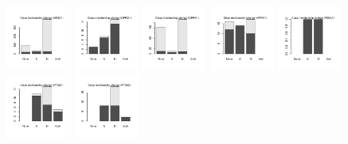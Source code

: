 \documentclass[utf8]{frontiersSCNS} %
\begin{document}
\begin{figure}[h!]
\includegraphics[width=0.19\textwidth]{figures/validation_plots/nr3c1_0p8_valplot.pdf}
\includegraphics[width=0.19\textwidth]{figures/validation_plots/oprd1_0p8_valplot.pdf}
\includegraphics[width=0.19\textwidth]{figures/validation_plots/oprk1_0p8_valplot.pdf}
\includegraphics[width=0.19\textwidth]{figures/validation_plots/oprm1_0p8_valplot.pdf}
\includegraphics[width=0.19\textwidth]{figures/validation_plots/pde3a_0p8_valplot.pdf}
\includegraphics[width=0.19\textwidth]{figures/validation_plots/ptgs1_0p8_valplot.pdf}
\includegraphics[width=0.19\textwidth]{figures/validation_plots/ptgs2_0p8_valplot.pdf}

\end{figure}
\end{document}
